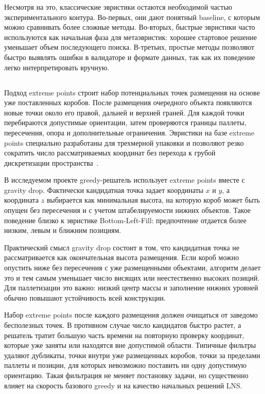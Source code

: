 Несмотря на это, классические эвристики остаются необходимой частью экспериментального контура. Во-первых, они дают понятный baseline, с которым можно сравнивать более сложные методы. Во-вторых, быстрые эвристики часто используются как начальная фаза для метаэвристик: хорошее стартовое решение уменьшает объем последующего поиска. В-третьих, простые методы позволяют быстро выявлять ошибки в валидаторе и формате данных, так как их поведение легко интерпретировать вручную.

\subsection{}

Подход extreme points строит набор потенциальных точек размещения на основе уже поставленных коробов. После размещения очередного объекта появляются новые точки около его правой, дальней и верхней граней. Для каждой точки перебираются допустимые ориентации, затем проверяются границы паллеты, пересечения, опора и дополнительные ограничения. Эвристики на базе extreme points специально разработаны для трехмерной упаковки и позволяют резко сократить число рассматриваемых координат без перехода к грубой дискретизации пространства~\cite{crainic2008}.

В исследуемом проекте greedy-решатель использует extreme points вместе с gravity drop. Фактически кандидатная точка задает координаты $x$ и $y$, а координата $z$ выбирается как минимальная высота, на которую короб может быть опущен без пересечения и с учетом штабелируемости нижних объектов. Такое поведение близко к эвристике Bottom-Left-Fill: предпочтение отдается более низким, левым и ближним позициям.

Практический смысл gravity drop состоит в том, что кандидатная точка не рассматривается как окончательная высота размещения. Если короб можно опустить ниже без пересечения с уже размещенными объектами, алгоритм делает это и тем самым уменьшает число висящих или неестественно высоких позиций. Для паллетизации это важно: низкий центр массы и заполнение нижних уровней обычно повышают устойчивость всей конструкции.

Набор extreme points после каждого размещения должен очищаться от заведомо бесполезных точек. В противном случае число кандидатов быстро растет, а решатель тратит большую часть времени на повторную проверку координат, которые уже заняты или находятся вне допустимой области. Типичные фильтры удаляют дубликаты, точки внутри уже размещенных коробов, точки за пределами паллеты и позиции, для которых невозможно поставить ни одну допустимую ориентацию. Такая фильтрация не меняет постановку задачи, но существенно влияет на скорость базового greedy и на качество начальных решений LNS.

